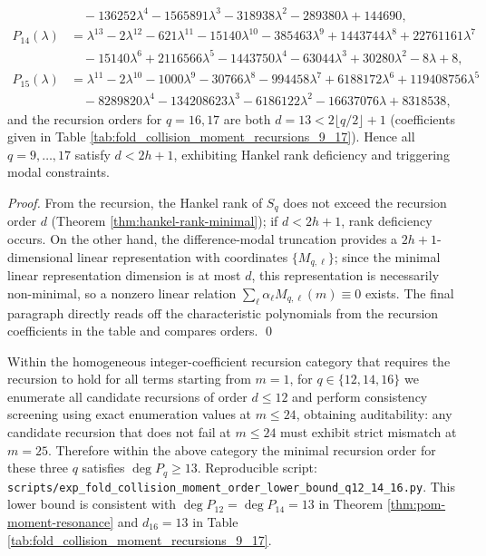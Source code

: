 \begin{theorem}
$$\begin{aligned}
&\quad-136252\lambda^4-1565891\lambda^3-318938\lambda^2-289380\lambda+144690,\\
P_{14}(\lambda)&=\lambda^{13}-2\lambda^{12}-621\lambda^{11}-15140\lambda^{10}-385463\lambda^9+1443744\lambda^8+22761161\lambda^7\\
&\quad-15140\lambda^6+2116566\lambda^5-1443750\lambda^4-63044\lambda^3+30280\lambda^2-8\lambda+8,\\
P_{15}(\lambda)&=\lambda^{11}-2\lambda^{10}-1000\lambda^9-30766\lambda^8-994458\lambda^7+6188172\lambda^6+119408756\lambda^5\\
&\quad-8289820\lambda^4-134208623\lambda^3-6186122\lambda^2-16637076\lambda+8318538,
\end{aligned}
$$
and the recursion orders for \(q=16,17\) are both \(d=13<2\lfloor q/2\rfloor+1\) (coefficients given in Table \ref{tab:fold_collision_moment_recursions_9_17}). Hence all \(q=9,\dots,17\) satisfy \(d<2h+1\), exhibiting Hankel rank deficiency and triggering modal constraints.
\end{theorem}
\begin{proof}
From the recursion, the Hankel rank of \(S_q\) does not exceed the recursion order \(d\) (Theorem \ref{thm:hankel-rank-minimal}); if \(d<2h+1\), rank deficiency occurs.
On the other hand, the difference-modal truncation provides a \(2h+1\)-dimensional linear representation with coordinates \(\{M_{q,\ell}\}\); since the minimal linear representation dimension is at most \(d\), this representation is necessarily non-minimal, so a nonzero linear relation \(\sum_{\ell}\alpha_\ell M_{q,\ell}(m)\equiv 0\) exists.
The final paragraph directly reads off the characteristic polynomials from the recursion coefficients in the table and compares orders. \qed
\end{proof}


\begin{remark}[Delayed manifestation of high-order complexity: order lower bounds for \texorpdfstring{$q=12,14,16$}{q=12,14,16} can be locked by first-violation audit at \texorpdfstring{$m=25$}{m=25}]\label{rem:pom-moment-order-lb-q12-14-16-m25}
Within the homogeneous integer-coefficient recursion category that requires the recursion to hold for all terms starting from \(m=1\),
for \(q\in\{12,14,16\}\) we enumerate all candidate recursions of order \(d\le 12\) and perform consistency screening using exact enumeration values at \(m\le 24\), obtaining auditability: any candidate recursion that does not fail at \(m\le 24\) must exhibit strict mismatch at \(m=25\).
Therefore within the above category the minimal recursion order for these three \(q\) satisfies
\(
\deg P_q\ge 13
\).
Reproducible script: \texttt{scripts/exp\_fold\_collision\_moment\_order\_lower\_bound\_q12\_14\_16.py}. This lower bound is consistent with \(\deg P_{12}=\deg P_{14}=13\) in Theorem \ref{thm:pom-moment-resonance} and \(d_{16}=13\) in Table \ref{tab:fold_collision_moment_recursions_9_17}.
\end{remark}


